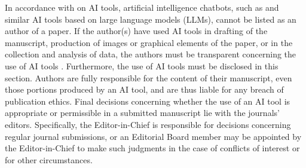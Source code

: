 \documentclass{ko-template}
\begin{document}
In accordance with  on AI tools, artificial intelligence chatbots, such as  and similar AI tools based on large language models (LLMs), cannot be listed as an author of a paper. If the author(s) have used AI tools in drafting of the manuscript, production of images or graphical elements of the paper, or in the collection and analysis of data, the authors must be transparent concerning the use of AI tools \parencite{aljanabi2023}. Furthermore, the use of AI tools must be disclosed in this section. Authors are fully responsible for the content of their manuscript, even those portions produced by an AI tool, and are thus liable for any breach of publication ethics. Final decisions concerning whether the use of an AI tool is appropriate or permissible in a submitted manuscript lie with the journals’ editors. Specifically, the Editor-in-Chief is responsible for decisions concerning regular journal submissions, or an Editorial Board member may be appointed by the Editor-in-Chief to make such judgments in the case of conflicts of interest or for other circumstances.




\printbibliography[heading=none]
\end{document}
